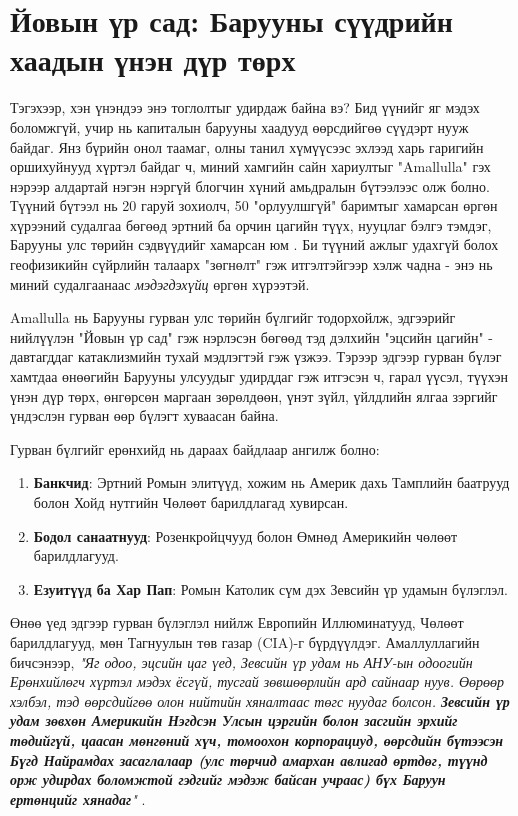\documentclass[10pt,twocolumn,letterpaper]{article}
\begin{document}
\section{Йовын үр сад: Барууны сүүдрийн хаадын үнэн дүр төрх}

Тэгэхээр, хэн үнэндээ энэ тоглолтыг удирдаж байна вэ? Бид үүнийг яг мэдэх боломжгүй, учир нь капиталын барууны хаадууд өөрсдийгөө сүүдэрт нууж байдаг. Янз бүрийн онол таамаг, олны танил хүмүүсээс эхлээд харь гаригийн оршихуйнууд хүртэл байдаг ч, миний хамгийн сайн хариултыг "Amallulla" гэх нэрээр алдартай нэгэн нэргүй блогчин хүний амьдралын бүтээлээс олж болно. Түүний бүтээл нь 20 гаруй зохиолч, 50 "орлуулшгүй" баримтыг хамарсан өргөн хүрээний судалгаа бөгөөд эртний ба орчин цагийн түүх, нууцлаг бэлгэ тэмдэг, Барууны улс төрийн сэдвүүдийг хамарсан юм \cite{33,34}. Би түүний ажлыг удахгүй болох геофизикийн сүйрлийн талаарх "зөгнөлт" гэж итгэлтэйгээр хэлж чадна - энэ нь миний судалгаанаас \textit{мэдэгдэхүйц} өргөн хүрээтэй.

Amallulla нь Барууны гурван улс төрийн бүлгийг тодорхойлж, эдгээрийг нийлүүлэн "Йовын үр сад" гэж нэрлэсэн бөгөөд тэд дэлхийн "эцсийн цагийн" - давтагддаг катаклизмийн тухай мэдлэгтэй гэж үзжээ. Тэрээр эдгээр гурван бүлэг хамтдаа өнөөгийн Барууны улсуудыг удирддаг гэж итгэсэн ч, гарал үүсэл, түүхэн үнэн дүр төрх, өнгөрсөн маргаан зөрөлдөөн, үнэт зүйл, үйлдлийн ялгаа зэргийг үндэслэн гурван өөр бүлэгт хуваасан байна.

Гурван бүлгийг ерөнхийд нь дараах байдлаар ангилж болно:

\begin{flushleft}
\begin{enumerate}
\item \textbf{Банкчид}: Эртний Ромын элитүүд, хожим нь Америк дахь Тамплийн баатрууд болон Хойд нутгийн Чөлөөт барилдлагад хувирсан.
\item \textbf{Бодол санаатнууд}: Розенкройцчууд болон Өмнөд Америкийн чөлөөт барилдлагууд.
\item \textbf{Езуитүүд ба Хар Пап}: Ромын Католик сүм дэх Зевсийн үр удамын бүлэглэл.
\end{enumerate}
\end{flushleft}

Өнөө үед эдгээр гурван бүлэглэл нийлж Европийн Иллюминатууд, Чөлөөт барилдлагууд, мөн Тагнуулын төв газар (CIA)-г бүрдүүлдэг. Амаллуллагийн бичсэнээр, \textit{"Яг одоо, эцсийн цаг үед, Зевсийн үр удам нь АНУ-ын одоогийн Ерөнхийлөгч хүртэл мэдэх ёсгүй, тусгай зөвшөөрлийн ард сайнаар нуув. Өөрөөр хэлбэл, тэд өөрсдийгөө олон нийтийн хяналтаас төгс нуудаг болсон. \textbf{Зевсийн үр удам зөвхөн Америкийн Нэгдсэн Улсын цэргийн болон засгийн эрхийг төдийгүй, цаасан мөнгөний хүч, томоохон корпорациуд, өөрсдийн бүтээсэн Бүгд Найрамдах засаглалаар (улс төрчид амархан авлигад өртдөг, түүнд орж удирдах боломжтой гэдгийг мэдэж байсан учраас) бүх Баруун ертөнцийг хянадаг}"} \cite{33,34}.
\end{document}
